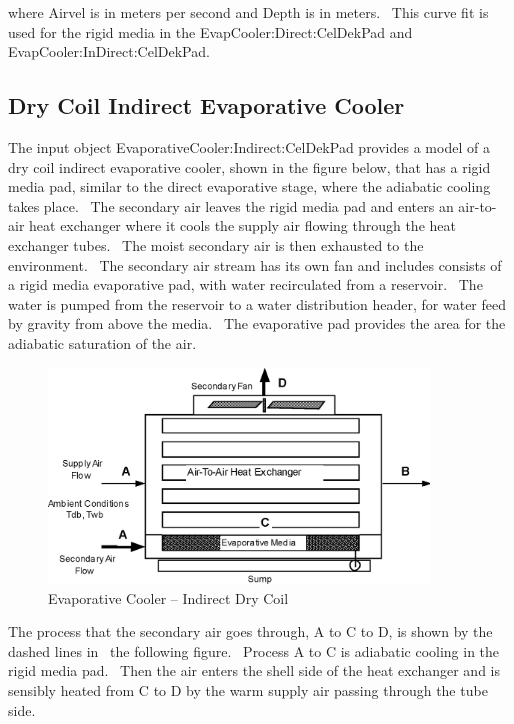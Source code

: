 where Airvel is in meters per second and Depth is in meters.~ This curve fit is used for the rigid media in the EvapCooler:Direct:CelDekPad and EvapCooler:InDirect:CelDekPad.

\subsection{Dry Coil Indirect Evaporative Cooler}\label{dry-coil-indirect-evaporative-cooler}

The input object EvaporativeCooler:Indirect:CelDekPad provides a model of a dry coil indirect evaporative cooler, shown in the figure below, that has a rigid media pad, similar to the direct evaporative stage, where the adiabatic cooling takes place.~ The secondary air leaves the rigid media pad and enters an air-to-air heat exchanger where it cools the supply air flowing through the heat exchanger tubes.~ The moist secondary air is then exhausted to the environment.~ The secondary air stream has its own fan and includes consists of a rigid media evaporative pad, with water recirculated from a reservoir.~ The water is pumped from the reservoir to a water distribution header, for water feed by gravity from above the media.~ The evaporative pad provides the area for the adiabatic saturation of the air.

\begin{figure}[hbtp] %
\centering
\includegraphics[width=0.9\textwidth, height=0.9\textheight, keepaspectratio=true]{media/image4794.png}
\caption{Evaporative Cooler -- Indirect Dry Coil \protect \label{fig:evaporative-cooler-indirect-dry-coil}}
\end{figure}

The process that the secondary air goes through, A to C to D, is shown by the dashed lines in~ the following figure.~ Process A to C is adiabatic cooling in the rigid media pad.~ Then the air enters the shell side of the heat exchanger and is sensibly heated from C to D by the warm supply air passing through the tube side.

